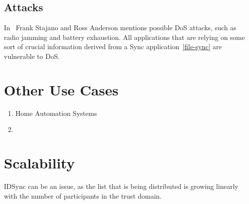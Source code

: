 \subsection{Attacks}
In~\cite{DBLP:conf/spw/StajanoA99} Frank Stajano and Ross Anderson mentions possible \gls{DoS} attacks, such as radio jamming and battery exhaustion. 
All applications that are relying on some sort of crucial information derived from a Sync application~\autoref{file-sync} are vulnerable to \gls{DoS}.

\section{Other Use Cases}

\begin{enumerate}
	\item Home Automation Systems
	\item 
\end{enumerate}

\section{Scalability}
IDSync can be an issue, as the list that is being distributed is growing linearly with the number of participants in the trust domain.